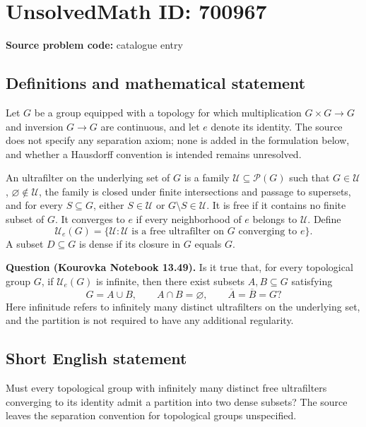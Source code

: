 \documentclass[11pt]{article}
\begin{document}
\section*{UnsolvedMath ID: 700967}
\textbf{Source problem code:} catalogue entry
\subsection{Definitions and mathematical statement}
Let \(G\) be a group equipped with a topology for which multiplication \(G\times G\to G\) and inversion \(G\to G\) are continuous, and let \(e\) denote its identity. The source does not specify any separation axiom; none is added in the formulation below, and whether a Hausdorff convention is intended remains unresolved.

An ultrafilter on the underlying set of \(G\) is a family \(\mathcal U\subseteq\mathcal P(G)\) such that \(G\in\mathcal U\), \(\varnothing\notin\mathcal U\), the family is closed under finite intersections and passage to supersets, and for every \(S\subseteq G\), either \(S\in\mathcal U\) or \(G\setminus S\in\mathcal U\). It is free if it contains no finite subset of \(G\). It converges to \(e\) if every neighborhood of \(e\) belongs to \(\mathcal U\). Define
\[
\mathscr U_e(G)=\{\mathcal U: \mathcal U\text{ is a free ultrafilter on }G\text{ converging to }e\}.
\]
A subset \(D\subseteq G\) is dense if its closure in \(G\) equals \(G\).

\textbf{Question (Kourovka Notebook 13.49).} Is it true that, for every topological group \(G\), if \(\mathscr U_e(G)\) is infinite, then there exist subsets \(A,B\subseteq G\) satisfying
\[
G=A\cup B,\qquad A\cap B=\varnothing,\qquad \overline A=\overline B=G?
\]
Here infinitude refers to infinitely many distinct ultrafilters on the underlying set, and the partition is not required to have any additional regularity.
\subsection{Short English statement}
Must every topological group with infinitely many distinct free ultrafilters converging to its identity admit a partition into two dense subsets? The source leaves the separation convention for topological groups unspecified.
\end{document}
